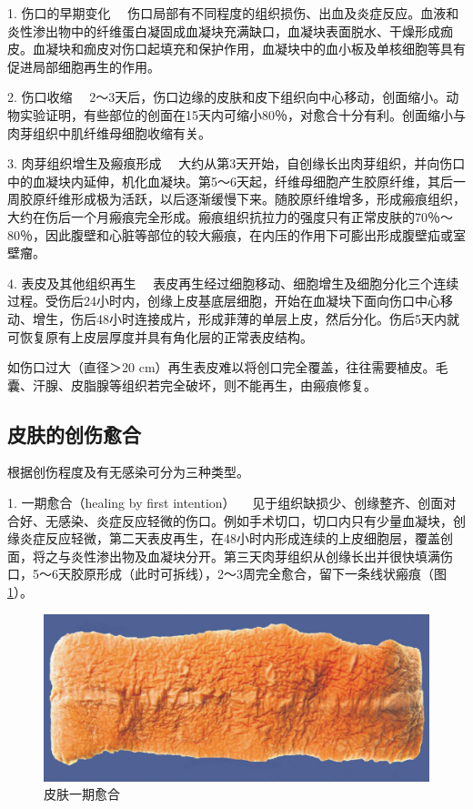 {1. 伤口的早期变化}
　伤口局部有不同程度的组织损伤、出血及炎症反应。血液和炎性渗出物中的纤维蛋白凝固成血凝块充满缺口，血凝块表面脱水、干燥形成痂皮。血凝块和痂皮对伤口起填充和保护作用，血凝块中的血小板及单核细胞等具有促进局部细胞再生的作用。

{2. 伤口收缩}
　2～3天后，伤口边缘的皮肤和皮下组织向中心移动，创面缩小。动物实验证明，有些部位的创面在15天内可缩小80％，对愈合十分有利。创面缩小与肉芽组织中肌纤维母细胞收缩有关。

{3. 肉芽组织增生及瘢痕形成}
　大约从第3天开始，自创缘长出肉芽组织，并向伤口中的血凝块内延伸，机化血凝块。第5～6天起，纤维母细胞产生胶原纤维，其后一周胶原纤维形成极为活跃，以后逐渐缓慢下来。随胶原纤维增多，形成瘢痕组织，大约在伤后一个月瘢痕完全形成。瘢痕组织抗拉力的强度只有正常皮肤的70％～80％，因此腹壁和心脏等部位的较大瘢痕，在内压的作用下可膨出形成腹壁疝或室壁瘤。

{4. 表皮及其他组织再生}
　表皮再生经过细胞移动、细胞增生及细胞分化三个连续过程。受伤后24小时内，创缘上皮基底层细胞，开始在血凝块下面向伤口中心移动、增生，伤后48小时连接成片，形成菲薄的单层上皮，然后分化。伤后5天内就可恢复原有上皮层厚度并具有角化层的正常表皮结构。

如伤口过大（直径＞20
cm）再生表皮难以将创口完全覆盖，往往需要植皮。毛囊、汗腺、皮脂腺等组织若完全破坏，则不能再生，由瘢痕修复。

\subsection{皮肤的创伤愈合}

根据创伤程度及有无感染可分为三种类型。

{1. 一期愈合（healing by first intention）}
　见于组织缺损少、创缘整齐、创面对合好、无感染、炎症反应轻微的伤口。例如手术切口，切口内只有少量血凝块，创缘炎症反应轻微，第二天表皮再生，在48小时内形成连续的上皮细胞层，覆盖创面，将之与炎性渗出物及血凝块分开。第三天肉芽组织从创缘长出并很快填满伤口，5～6天胶原形成（此时可拆线），2～3周完全愈合，留下一条线状瘢痕（图\ref{fig2-6}）。

\begin{figure}[!htbp]
	\centering
    \includegraphics{./images/Image00029.jpg}
	\caption{皮肤一期愈合}
	\label{fig2-6} 
	\end{figure} 　

